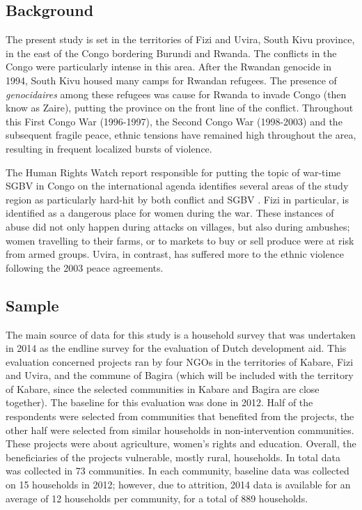 \documentclass[10pt,a4paper,abstract=on]{scrartcl} %
\newcommand{\tableloc}{C:/Users/Koen/Dropbox/PhD/Papers/CongoGBV/Tables}
\begin{document}
\newcommand{\summstat}[2]{\csvreader[filter strcmp={\var}{#1}]{\tableloc/balance.csv}{var=\var,#2=\stat}{\stat}}

\subsection*{Background}
The present study is set in the territories of Fizi and Uvira, South Kivu province, in the east of the Congo bordering Burundi and Rwanda. The conflicts in the Congo were particularly intense in this area. After the Rwandan genocide in 1994, South Kivu housed many camps for Rwandan refugees. The presence of \textit{genocidaires} among these refugees was cause for Rwanda to invade Congo (then know as Zaire), putting the province on the front line of the conflict. Throughout this First Congo War (1996-1997), the Second Congo War (1998-2003) and the subsequent fragile peace, ethnic tensions have remained high throughout the area, resulting in frequent localized bursts of violence.

The Human Rights Watch report responsible for putting the topic of war-time SGBV in Congo on the international agenda identifies several areas of the study region as particularly hard-hit by both conflict and SGBV \citep{HRW2002}. Fizi in particular, is identified as a dangerous place for women during the war. These instances of abuse did not only happen during attacks on villages, but also during ambushes; women travelling to their farms, or to markets to buy or sell produce were at risk from armed groups. Uvira, in contrast, has suffered more to the ethnic violence following the 2003 peace agreements.

\subsection*{Sample}
The main source of data for this study is a household survey that was undertaken in 2014 as the endline survey for the evaluation of Dutch development aid. This evaluation concerned projects ran by four NGOs in the territories of Kabare, Fizi and Uvira, and the commune of Bagira (which will be included with the territory of Kabare, since the selected communities in Kabare and Bagira are close together). The baseline for this evaluation was done in 2012. Half of the respondents were selected from communities that benefited from the projects, the other half were selected from similar households in non-intervention communities. These projects were about agriculture, women's rights and education. Overall, the beneficiaries of the projects vulnerable, mostly rural, households. In total data was collected in 73 communities. In each community, baseline data was collected on 15 households in 2012; however, due to attrition, 2014 data is available for an average of 12 households per community, for a total of 889 households. 
\end{document}
